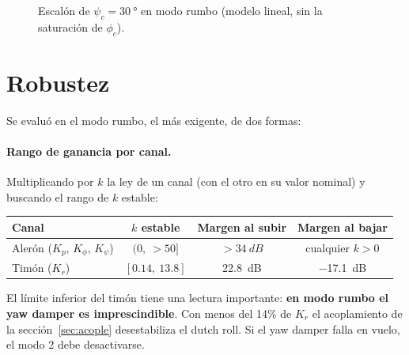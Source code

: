 \documentclass[11pt,a4paper]{article}
\begin{document}
\begin{figure}[htbp]
\centering
{}
\caption{Escalón de $\psi_c = \SI{30}{\degree}$ en modo rumbo (modelo lineal,
sin la saturación de $\phi_c$).}
\label{fig:psi}
\end{figure}

\section{Robustez}

Se evaluó en el modo rumbo, el más exigente, de dos formas:

\paragraph{Rango de ganancia por canal.} Multiplicando por $k$ la ley de un
canal (con el otro en su valor nominal) y buscando el rango de $k$ estable:

\begin{center}
\begin{tabular}{lccc}
\toprule
Canal & $k$ estable & Margen al subir & Margen al bajar \\
\midrule
Alerón ($K_p$, $K_\phi$, $K_\psi$) & $(0,\ >50]$ & $> \SI{34}{dB}$ & cualquier $k > 0$ \\
Timón ($K_r$)                         & $[0.14,\ 13.8]$ & \SI{22.8}{dB} & \SI{-17.1}{dB} \\
\bottomrule
\end{tabular}
\end{center}

El límite inferior del timón tiene una lectura importante: \textbf{en modo
rumbo el yaw damper es imprescindible}. Con menos del 14\% de $K_r$ el
acoplamiento de la sección~\ref{sec:acople} desestabiliza el dutch roll. Si el
yaw damper falla en vuelo, el modo 2 debe desactivarse.
\end{document}
